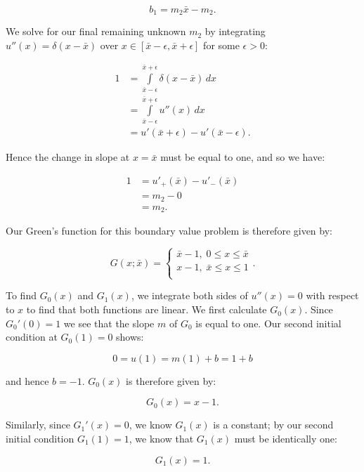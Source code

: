 \begin{solution}
    $$
    b_1 = m_2 \bar{x} - m_2.
    $$

    We solve for our final remaining unknown $m_2$ by integrating $u''(x) = \delta(x - \bar{x})$ over 
    $x \in [\bar{x} - \epsilon, \bar{x} + \epsilon]$ for some $\epsilon > 0$:

    \begin{align*}
        1 &= \int\limits_{\bar{x} - \epsilon}^{\bar{x} + \epsilon}{\delta(x - \bar{x})\, dx} \\
          &= \int\limits_{\bar{x} - \epsilon}^{\bar{x} + \epsilon}{u''(x)\, dx} \\
          &= u'(\bar{x} + \epsilon) - u'(\bar{x} - \epsilon).
    \end{align*}

    Hence the change in slope at $x = \bar{x}$ must be equal to one, and so we have:

    \begin{align*}
        1 &= u'_+(\bar{x}) - u'_-(\bar{x}) \\
          &= m_2 - 0 \\
          &= m_2.
    \end{align*}

    Our Green's function for this boundary value problem is therefore given by:

    $$
    G(x; \bar{x}) = \begin{cases}
        \bar{x} - 1,\; 0 \le x \le \bar{x} \\
        x - 1,\; \bar{x} \le x \le 1 \\
    \end{cases}.
    $$

    To find $G_0(x)$ and $G_1(x)$, we integrate both sides of $u''(x) = 0$ with respect to $x$ to find that both
    functions are linear. We first calculate $G_0(x)$. Since $G_0'(0) = 1$ we see that the slope $m$ of $G_0$ is equal
    to one. Our second initial condition at $G_0(1) = 0$ shows:
    
    $$
    0 = u(1) = m(1) + b = 1 + b
    $$

    and hence $b = -1$. $G_0(x)$ is therefore given by:

    $$
    G_0(x) = x - 1.
    $$

    Similarly, since $G_1'(x) = 0$, we know $G_1(x)$ is a constant; by our second initial condition $G_1(1) = 1$, we 
    know that $G_1(x)$ must be identically one:

    $$
    G_1(x) = 1.
    $$
\end{solution}

